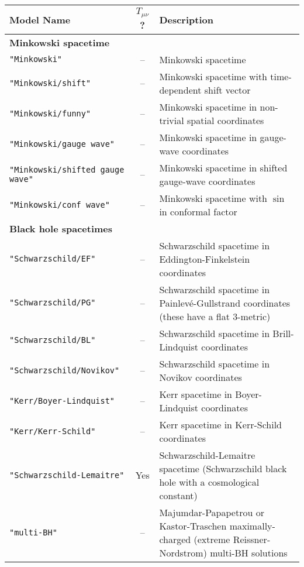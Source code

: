 \begin{table}[htbp]
\begin{center}
\begin{tabular}{@{\qquad}lcp{80mm}}
Model Name
	& $T_{\mu\nu}$?
		& Description						\\
\hline %
%
\multicolumn{3}{l}{\bf Minkowski spacetime}				\\
{\tt "Minkowski"}
	& --	& Minkowski spacetime					\\
{\tt "Minkowski/shift"}
	& --	& Minkowski spacetime with time-dependent shift vector	\\
{\tt "Minkowski/funny"}
	& --	& Minkowski spacetime in non-trivial spatial coordinates\\
{\tt "Minkowski/gauge wave"}
	& --	& Minkowski spacetime in gauge-wave coordinates		\\
{\tt "Minkowski/shifted gauge wave"}
	& --	& Minkowski spacetime in shifted gauge-wave coordinates	\\
{\tt "Minkowski/conf wave"}
	& --	& Minkowski spacetime with $\sin$ in conformal factor	\\[1ex]
%
\multicolumn{3}{l}{\bf Black hole spacetimes}				\\
{\tt "Schwarzschild/EF"}
	& --	& Schwarzschild spacetime
		  in Eddington-Finkelstein coordinates			\\
{\tt "Schwarzschild/PG"}
	& --	& Schwarzschild spacetime in Painlev\'{e}-Gullstrand
		  coordinates (these have a flat 3-metric)		\\
{\tt "Schwarzschild/BL"}
	& --	& Schwarzschild spacetime in Brill-Lindquist coordinates\\
{\tt "Schwarzschild/Novikov"}
	& --	& Schwarzschild spacetime in Novikov coordinates	\\
{\tt "Kerr/Boyer-Lindquist"}
	& --	& Kerr spacetime in Boyer-Lindquist coordinates		\\
{\tt "Kerr/Kerr-Schild"}
	& --	& Kerr spacetime in Kerr-Schild coordinates		\\
{\tt "Schwarzschild-Lemaitre"}
	& Yes	& Schwarzschild-Lemaitre spacetime (Schwarzschild
		  black hole with a cosmological constant)		\\
{\tt "multi-BH"}
	& --	& Majumdar-Papapetrou or Kastor-Traschen
		  maximally-charged (extreme Reissner-Nordstrom)
		  multi-BH solutions					\\

\end{tabular}
\end{center}
\end{table}
